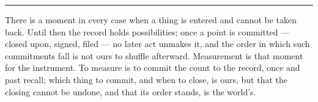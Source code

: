 %
%
%
%

\bigskip
\begin{center}
\rule{0.4\textwidth}{0.4pt}
\end{center}
\bigskip

\noindent There is a moment in every case when a thing is entered and cannot be taken back. Until then the
record holds possibilities; once a point is committed --- closed upon, signed, filed --- no later act unmakes
it, and the order in which such commitments fall is not ours to shuffle afterward. Measurement is that moment
for the instrument. To measure is to commit the count to the record, once and past recall; which thing to
commit, and when to close, is ours, but that the closing cannot be undone, and that its order stands, is the
world's.

